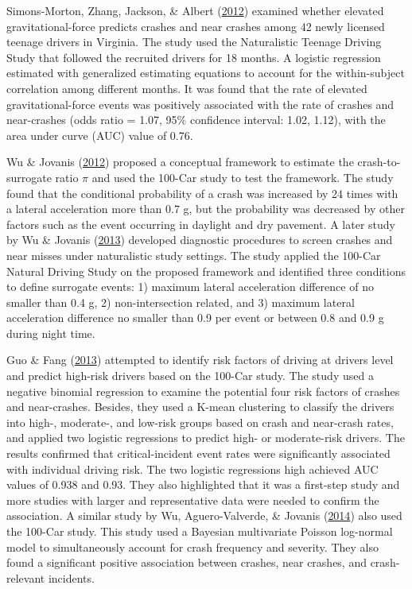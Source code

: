 \documentclass[12pt]{book}
\numberwithin{equation}{chapter}
\begin{document}
Simons-Morton, Zhang, Jackson, \& Albert (\protect\hyperlink{ref-simons2012elevated}{2012}) examined whether elevated gravitational-force predicts crashes and near crashes among 42 newly licensed teenage drivers in Virginia. The study used the Naturalistic Teenage Driving Study that followed the recruited drivers for 18 months. A logistic regression estimated with generalized estimating equations to account for the within-subject correlation among different months. It was found that the rate of elevated gravitational-force events was positively associated with the rate of crashes and near-crashes (odds ratio = 1.07, 95\% confidence interval: 1.02, 1.12), with the area under curve (AUC) value of 0.76.

Wu \& Jovanis (\protect\hyperlink{ref-wu2012crashes}{2012}) proposed a conceptual framework to estimate the crash-to-surrogate ratio \(\pi\) and used the 100-Car study to test the framework. The study found that the conditional probability of a crash was increased by 24 times with a lateral acceleration more than 0.7 g, but the probability was decreased by other factors such as the event occurring in daylight and dry pavement. A later study by Wu \& Jovanis (\protect\hyperlink{ref-wu2013defining}{2013}) developed diagnostic procedures to screen crashes and near misses under naturalistic study settings. The study applied the 100-Car Natural Driving Study on the proposed framework and identified three conditions to define surrogate events: 1) maximum lateral acceleration difference of no smaller than 0.4 g, 2) non-intersection related, and 3) maximum lateral acceleration difference no smaller than 0.9 per event or between 0.8 and 0.9 g during night time.

Guo \& Fang (\protect\hyperlink{ref-guo2013individual}{2013}) attempted to identify risk factors of driving at drivers level and predict high-risk drivers based on the 100-Car study. The study used a negative binomial regression to examine the potential four risk factors of crashes and near-crashes. Besides, they used a K-mean clustering to classify the drivers into high-, moderate-, and low-risk groups based on crash and near-crash rates, and applied two logistic regressions to predict high- or moderate-risk drivers. The results confirmed that critical-incident event rates were significantly associated with individual driving risk. The two logistic regressions high achieved AUC values of 0.938 and 0.93. They also highlighted that it was a first-step study and more studies with larger and representative data were needed to confirm the association. A similar study by Wu, Aguero-Valverde, \& Jovanis (\protect\hyperlink{ref-wu2014using}{2014}) also used the 100-Car study. This study used a Bayesian multivariate Poisson log-normal model to simultaneously account for crash frequency and severity. They also found a significant positive association between crashes, near crashes, and crash-relevant incidents.
\end{document}
